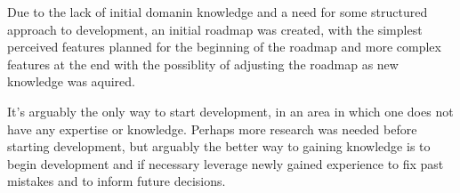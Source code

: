 Due to the lack of initial domanin knowledge and a need for some structured approach
to development, an initial roadmap was created, with the simplest perceived features
planned for the beginning of the roadmap and more complex features at the end with
the possiblity of adjusting the roadmap as new knowledge was aquired. 

It's arguably the only way to start development, in an area in which one does not have any
expertise or knowledge. Perhaps more research was needed before starting development,
but arguably the better way to gaining knowledge is to begin development and if
necessary leverage newly gained experience to fix past mistakes and to inform future
decisions. \\ 

\newpage
